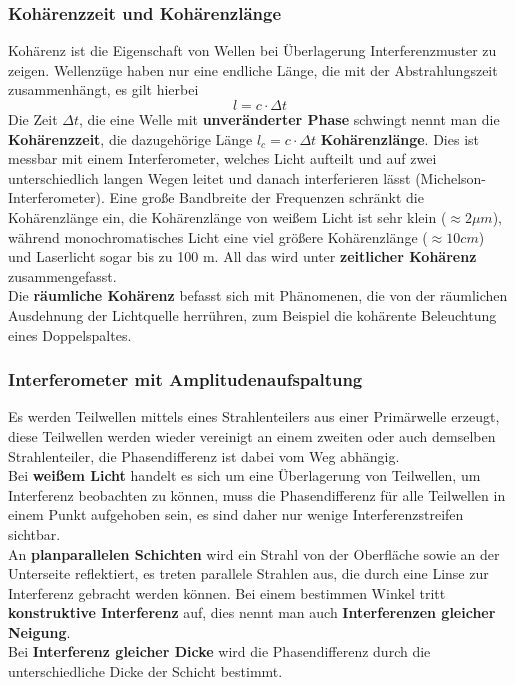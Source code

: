\documentclass[12pt,a4paper,ngerman]{article}
\begin{document}
\subsubsection*{Kohärenzzeit und Kohärenzlänge}
Kohärenz ist die Eigenschaft von Wellen bei Überlagerung Interferenzmuster zu zeigen. Wellenzüge haben nur eine endliche Länge, die mit der Abstrahlungszeit zusammenhängt, es gilt hierbei 
\begin{equation}
l = c \cdot \Delta t
\end{equation}
Die Zeit $\Delta t $, die eine Welle mit \textbf{unveränderter Phase} schwingt nennt man die \textbf{Kohärenzzeit}, die dazugehörige Länge $l_c = c \cdot \Delta t$ \textbf{Kohärenzlänge}. Dies ist messbar mit einem Interferometer, welches Licht aufteilt und auf zwei unterschiedlich langen Wegen leitet und danach interferieren lässt (Michelson-Interferometer). 
Eine große Bandbreite der Frequenzen schränkt die Kohärenzlänge ein, die Kohärenzlänge von weißem Licht ist sehr klein ($\approx 2\mu m$), während monochromatisches Licht eine viel größere Kohärenzlänge ($\approx 10 cm$) und Laserlicht sogar bis zu 100 m. All das wird unter \textbf{zeitlicher Kohärenz} zusammengefasst.
\\ Die \textbf{räumliche Kohärenz} befasst sich mit Phänomenen, die von der räumlichen Ausdehnung der Lichtquelle herrühren, zum Beispiel die kohärente Beleuchtung eines Doppelspaltes. 
\subsubsection*{Interferometer mit Amplitudenaufspaltung}
Es werden Teilwellen mittels eines Strahlenteilers aus einer Primärwelle erzeugt, diese Teilwellen werden wieder vereinigt an einem zweiten oder auch demselben Strahlenteiler, die Phasendifferenz ist dabei vom Weg abhängig. 
\\
Bei \textbf{weißem Licht} handelt es sich um eine Überlagerung von Teilwellen, um Interferenz beobachten zu können, muss die Phasendifferenz für alle Teilwellen in einem Punkt aufgehoben sein, es sind daher nur wenige Interferenzstreifen sichtbar. \\
An \textbf{planparallelen Schichten} wird ein Strahl von der Oberfläche sowie an der Unterseite reflektiert, es treten parallele Strahlen aus, die durch eine Linse zur Interferenz gebracht werden können. Bei einem bestimmen Winkel tritt \textbf{konstruktive Interferenz} auf, dies nennt man auch \textbf{Interferenzen gleicher Neigung}. \\
Bei \textbf{Interferenz gleicher Dicke} wird die Phasendifferenz durch die unterschiedliche Dicke der Schicht bestimmt. 
\end{document}
